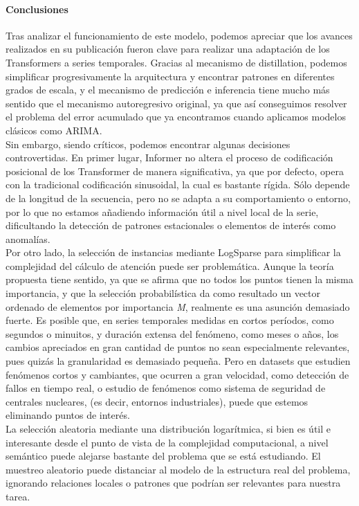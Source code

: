 \paragraph{Conclusiones}
Tras analizar el funcionamiento de este modelo, podemos apreciar que los avances realizados en su publicación fueron clave para realizar una adaptación de los Transformers a series temporales. Gracias al mecanismo de distillation, podemos simplificar progresivamente la arquitectura y encontrar patrones en diferentes grados de escala, y el mecanismo de predicción e inferencia tiene mucho más sentido que el mecanismo autoregresivo original, ya que así conseguimos resolver el problema del error acumulado que ya encontramos cuando aplicamos modelos clásicos como ARIMA.\\

Sin embargo, siendo críticos, podemos encontrar algunas decisiones controvertidas. En primer lugar, Informer no altera el proceso de codificación posicional de los Transformer de manera significativa, ya que por defecto, opera con la tradicional codificación sinusoidal, la cual es bastante rígida. Sólo depende de la longitud de la secuencia, pero no se adapta a su comportamiento o entorno, por lo que no estamos añadiendo información útil a nivel local de la serie, dificultando la detección de patrones estacionales o elementos de interés como  anomalías.\\

Por otro lado, la selección de instancias mediante LogSparse para simplificar la complejidad del cálculo de atención puede ser problemática. Aunque la teoría propuesta tiene sentido, ya que se afirma que no todos los puntos tienen la misma importancia, y que la selección probabilística da como resultado un vector ordenado de elementos por importancia \textit{M}, realmente es una asunción demasiado fuerte. Es posible que, en series temporales medidas en cortos períodos, como segundos o minuitos, y duración extensa del fenómeno, como meses o años, los cambios apreciados en gran cantidad de puntos no sean especialmente relevantes, pues quizás la granularidad es demasiado pequeña. Pero en datasets que estudien fenómenos cortos y cambiantes, que ocurren a gran velocidad, como detección de fallos en tiempo real, o estudio de fenómenos como sistema de seguridad de centrales nucleares, (es decir, entornos industriales), puede que estemos eliminando puntos de interés.\\

La selección aleatoria mediante una distribución logarítmica, si bien es útil e interesante desde el punto de vista de la complejidad computacional, a nivel semántico puede alejarse bastante del problema que se está estudiando. El muestreo aleatorio puede distanciar al modelo de la estructura real del problema, ignorando relaciones locales o patrones que podrían ser relevantes para nuestra tarea.\\

